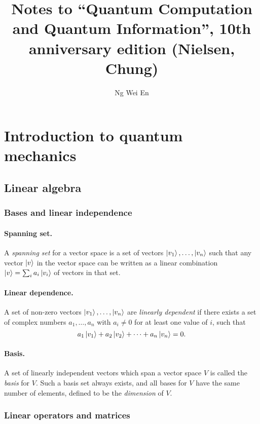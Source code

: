 \documentclass{article}
\title{Notes to ``Quantum Computation and Quantum Information'', 10th
anniversary edition (Nielsen, Chung)}
\author{Ng Wei En}
\numberwithin{theorem}{section}
\numberwithin{corollary}{section}
\begin{document}
\maketitle
\tableofcontents
\newpage

\setcounter{section}{1}
\section{Introduction to quantum mechanics}

\subsection{Linear algebra}

\subsubsection{Bases and linear independence}

\paragraph{Spanning set.} A \emph{spanning set} for a vector space is a set of
vectors $\ket{v_1}, \ldots, \ket{v_n}$ such that any vector $\ket{v}$ in the
vector space can be written as a linear combination $\ket{v} = \sum_i
a_i\ket{v_i}$ of vectors in that set.

\paragraph{Linear dependence.} A set of non-zero vectors $\ket{v_1}, \ldots,
\ket{v_n}$ are \emph{linearly dependent} if there exists a set of complex
numbers $a_1, \ldots, a_n$ with $a_i \neq 0$ for at least one value of $i$,
such that \[
  a_1\ket{v_1} + a_2\ket{v_2} + \cdots + a_n\ket{v_n} = 0.
\]

\paragraph{Basis.} A set of linearly independent vectors which span a vector
space $V$ is called the \emph{basis} for $V$. Such a basis set always exists,
and all bases for $V$ have the same number of elements, defined to be the
\emph{dimension} of $V$.

\subsubsection{Linear operators and matrices}
\end{document}

